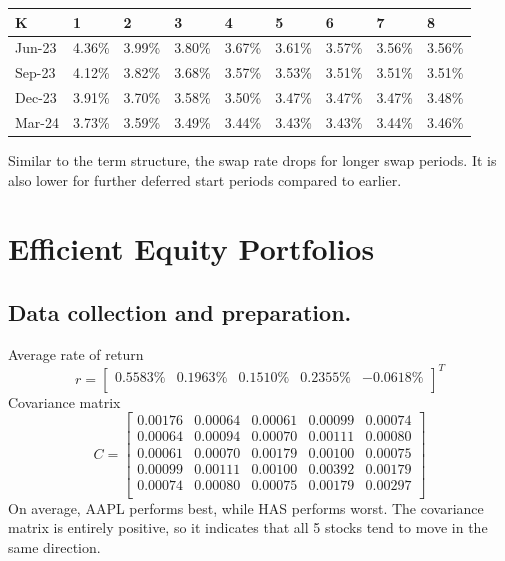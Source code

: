 \begin{table}[h]
  \begin{tabular}{|l|l|l|l|l|l|l|l|l|}
  \hline
  K      & 1      & 2      & 3      & 4      & 5      & 6      & 7      & 8      \\ \hline
  Jun-23 & 4.36\% & 3.99\% & 3.80\% & 3.67\% & 3.61\% & 3.57\% & 3.56\% & 3.56\% \\ \hline
  Sep-23 & 4.12\% & 3.82\% & 3.68\% & 3.57\% & 3.53\% & 3.51\% & 3.51\% & 3.51\% \\ \hline
  Dec-23 & 3.91\% & 3.70\% & 3.58\% & 3.50\% & 3.47\% & 3.47\% & 3.47\% & 3.48\% \\ \hline
  Mar-24 & 3.73\% & 3.59\% & 3.49\% & 3.44\% & 3.43\% & 3.43\% & 3.44\% & 3.46\% \\ \hline
  \end{tabular}
  \end{table}
Similar to the term structure, the swap rate drops for longer swap periods. 
It is also lower for further deferred start periods compared to earlier.

\newpage
\section{Efficient Equity Portfolios}
\subsection{Data collection and preparation.}
Average rate of return
\[r =\begin{bmatrix}
  0.5583\% & 0.1963\% & 0.1510\% & 0.2355\% & -0.0618\% \\
   
  \end{bmatrix}^T \]
Covariance matrix
\[ C = 
\begin{bmatrix}
  0.00176 & 0.00064 & 0.00061 & 0.00099 & 0.00074 \\
  0.00064 & 0.00094 & 0.00070 & 0.00111 & 0.00080 \\
  0.00061 & 0.00070 & 0.00179 & 0.00100 & 0.00075 \\
  0.00099 & 0.00111 & 0.00100 & 0.00392 & 0.00179 \\
  0.00074 & 0.00080 & 0.00075 & 0.00179 & 0.00297 \\
   
  \end{bmatrix}  \]
On average, AAPL performs best, while HAS performs worst.
The covariance matrix is entirely positive, 
so it indicates that all 5 stocks tend to move in the same direction.

